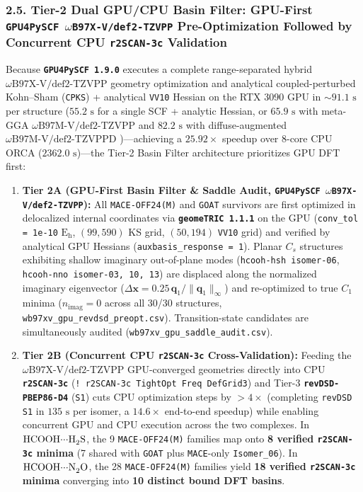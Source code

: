 \documentclass[journal=jpclcd,manuscript=article]{achemso}
\begin{document}
\subsubsection{2.5. Tier-2 Dual GPU/CPU Basin Filter: GPU-First \texttt{GPU4PySCF $\omega$B97X-V/def2-TZVPP} Pre-Optimization Followed by Concurrent CPU \texttt{r2SCAN-3c} Validation}
Because \textbf{\texttt{GPU4PySCF 1.9.0}} \cite{Sun2018, Sun2020, Wu2024, Li2024} executes a complete range-separated hybrid \textbf{$\omega\text{B97X-V/def2-TZVPP}$} \cite{Mardirossian2014, Vydrov2010, Weigend2005, Weigend2006} geometry optimization and analytical coupled-perturbed Kohn--Sham (\texttt{CPKS}) + analytical \texttt{VV10} Hessian on the RTX 3090 GPU in $\sim 91.1\text{ s}$ per structure ($55.2\text{ s}$ for a single SCF + analytic Hessian, or $65.9\text{ s}$ with meta-GGA \textbf{$\omega\text{B97M-V/def2-TZVPP}$} \cite{Mardirossian2016} and $82.2\text{ s}$ with diffuse-augmented \textbf{$\omega\text{B97M-V/def2-TZVPPD}$} \cite{Rappoport2010})---achieving a $\mathbf{25.92\times}$ speedup over 8-core CPU ORCA ($2362.0\text{ s}$)---the Tier-2 Basin Filter architecture prioritizes GPU DFT first:
\begin{enumerate}
  \item \textbf{Tier 2A (GPU-First Basin Filter \& Saddle Audit, \texttt{GPU4PySCF $\omega$B97X-V/def2-TZVPP}):} All \texttt{MACE-OFF24(M)} and \texttt{GOAT} survivors are first optimized in delocalized internal coordinates via \textbf{\texttt{geomeTRIC 1.1.1}} \cite{Wang2016} on the GPU (\texttt{conv\_tol = 1e-10} $\mathrm{E_h}$, $(99,590)$ KS grid, $(50,194)$ \texttt{VV10} grid) and verified by analytical GPU Hessians (\texttt{auxbasis\_response = 1}). Planar $C_s$ structures exhibiting shallow imaginary out-of-plane modes (\texttt{hcooh-hsh isomer-06}, \texttt{hcooh-nno isomer-03, 10, 13}) are displaced along the normalized imaginary eigenvector ($\Delta\mathbf{x} = 0.25\,\mathbf{q}_1 / \|\mathbf{q}_1\|_\infty$) and re-optimized to true $C_1$ minima ($n_{\mathrm{imag}} = 0$ across all 30/30 structures, \texttt{wb97xv\_gpu\_revdsd\_preopt.csv}). Transition-state candidates are simultaneously audited (\texttt{wb97xv\_gpu\_saddle\_audit.csv}).
  \item \textbf{Tier 2B (Concurrent CPU \texttt{r2SCAN-3c} Cross-Validation):} Feeding the $\omega\text{B97X-V/def2-TZVPP}$ GPU-converged geometries directly into CPU \textbf{\texttt{r2SCAN-3c}} \cite{Grimme2021, Furness2020, Caldeweyher2019, Kruse2012} (\texttt{! r2SCAN-3c TightOpt Freq DefGrid3}) and Tier-3 \textbf{\texttt{revDSD-PBEP86-D4}} (\texttt{S1}) cuts CPU optimization steps by $>4\times$ (completing \texttt{revDSD S1} in $135\text{ s}$ per isomer, a $\mathbf{14.6\times}$ end-to-end speedup) while enabling concurrent GPU and CPU execution across the two complexes. In $\ce{HCOOH\bond{...}H2S}$, the 9 \texttt{MACE-OFF24(M)} families map onto \textbf{8 verified \texttt{r2SCAN-3c} minima} (7 shared with \texttt{GOAT} plus \texttt{MACE}-only \texttt{Isomer\_06}). In $\ce{HCOOH\bond{...}N2O}$, the 28 \texttt{MACE-OFF24(M)} families yield \textbf{18 verified \texttt{r2SCAN-3c} minima} converging into \textbf{10 distinct bound DFT basins}.
\end{enumerate}
\end{document}

